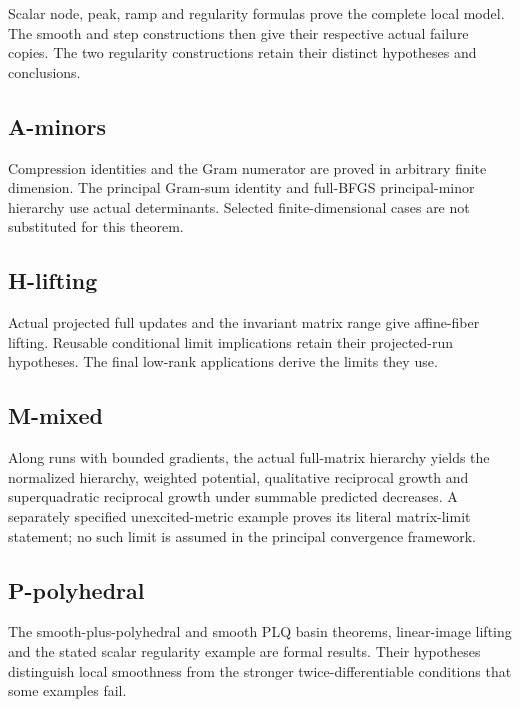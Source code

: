 Scalar node, peak, ramp and regularity formulas prove the complete local model. The smooth and step constructions then give their respective actual failure copies. The two regularity constructions retain their distinct hypotheses and conclusions.



\subsection{A-minors}\label{a-minors}

Compression identities and the Gram numerator are proved in arbitrary finite dimension. The principal Gram-sum identity and full-BFGS principal-minor hierarchy use actual determinants. Selected finite-dimensional cases are not substituted for this theorem.



\subsection{H-lifting}\label{h-lifting}

Actual projected full updates and the invariant matrix range give affine-fiber lifting. Reusable conditional limit implications retain their projected-run hypotheses. The final low-rank applications derive the limits they use.



\subsection{M-mixed}\label{m-mixed}

Along runs with bounded gradients, the actual full-matrix hierarchy yields the normalized hierarchy, weighted potential, qualitative reciprocal growth and superquadratic reciprocal growth under summable predicted decreases. A separately specified unexcited-metric example proves its literal matrix-limit statement; no such limit is assumed in the principal convergence framework.



\subsection{P-polyhedral}\label{p-polyhedral}

The smooth-plus-polyhedral and smooth PLQ basin theorems, linear-image lifting and the stated scalar regularity example are formal results. Their hypotheses distinguish local smoothness from the stronger twice-differentiable conditions that some examples fail.

